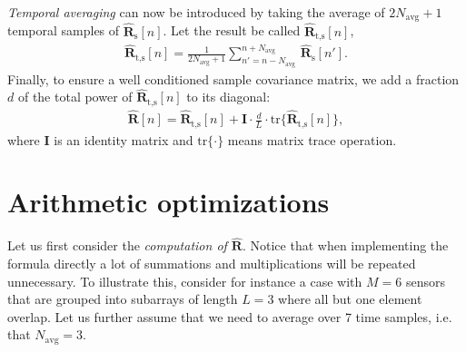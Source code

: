 \documentclass[12pt,journal,captionsoff,onecolumn]{IEEEtran}
\newcommand\tr{\text{tr}}
\newcommand\sumb[2]{\sum\limits_{#1}^{#2}\,}
\newcommand\mat[1]{\boldsymbol{#1}}
\newcommand\1{\vec 1}
\newcommand\I{\mat I}
\newcommand*\eR{\mat{\hat R}}
\begin{document}
\emph{Temporal averaging} can now be introduced by taking the average of $2N_\text{avg}+1$ temporal samples of $\eR_\text{s}[n]$. Let the result be called $\eR_\text{t,s}[n]$,
\begin{gather}
\eR_\text{t,s}[n] = \frac{1}{2N_\text{avg}+1} \sumb{n'=n-N_\text{avg}}{n+N_\text{avg}} \eR_\text{s}[n'].
\end{gather}
Finally, to ensure a well conditioned sample covariance matrix, we add a fraction $d$ of the total power of $\eR_\text{t,s}[n]$ to its diagonal\cite{Synnevag2007}:
\begin{align}
\eR[n] = \eR_\text{t,s}[n] + \I \cdot \frac{d}{L} \cdot \tr\{\eR_\text{t,s}[n]\},\label{finalR}
\end{align}
where $\I$ is an identity matrix and $\tr\{\cdot\}$ means matrix trace operation.


\section{Arithmetic optimizations}

Let us first consider the \emph{computation of $\hat{\mat R}$}. Notice that when implementing the formula directly a lot of summations and multiplications will be repeated unnecessary. To illustrate this, consider for instance a case with $M=6$ sensors that are grouped into subarrays of length $L=3$ where all but one element overlap. Let us further assume that we need to average over 7 time samples, i.e. that $N_{\text{avg}} = 3$. 
\end{document}
